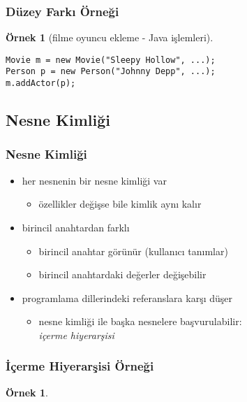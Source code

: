 \documentclass[dvipsnames]{beamer}
\theoremstyle{definition}
\theoremstyle{example}
\newtheorem{ornek}[theorem]{Örnek}
\theoremstyle{plain}
\begin{document}
\begin{frame}[fragile]
  \frametitle{Düzey Farkı Örneği}

  \begin{ornek}[filme oyuncu ekleme - Java işlemleri]
    \begin{lstlisting}
Movie m = new Movie("Sleepy Hollow", ...);
Person p = new Person("Johnny Depp", ...);
m.addActor(p);
    \end{lstlisting}
  \end{ornek}
\end{frame}

\subsection{Nesne Kimliği}

\begin{frame}
  \frametitle{Nesne Kimliği}

  \begin{itemize}
    \item her nesnenin bir nesne kimliği var
    \begin{itemize}
      \item özellikler değişse bile kimlik aynı kalır
    \end{itemize}

    \pause
    \item birincil anahtardan farklı
    \begin{itemize}
      \item birincil anahtar görünür (kullanıcı tanımlar)
      \item birincil anahtardaki değerler değişebilir
    \end{itemize}

    \pause
    \item programlama dillerindeki referanslara karşı düşer
    \begin{itemize}
      \item nesne kimliği ile başka nesnelere başvurulabilir:\\
        \emph{içerme hiyerarşisi}
    \end{itemize}
  \end{itemize}
\end{frame}

\begin{frame}
  \frametitle{İçerme Hiyerarşisi Örneği}

  \begin{ornek}
    \begin{center}
    \end{center}
  \end{ornek}
\end{frame}
\end{document}
